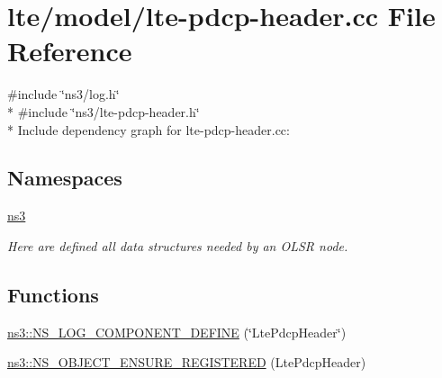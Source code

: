 \hypertarget{lte-pdcp-header_8cc}{}\section{lte/model/lte-\/pdcp-\/header.cc File Reference}
\label{lte-pdcp-header_8cc}
{\ttfamily \#include \char`\"{}ns3/log.\+h\char`\"{}}\\*
{\ttfamily \#include \char`\"{}ns3/lte-\/pdcp-\/header.\+h\char`\"{}}\\*
Include dependency graph for lte-\/pdcp-\/header.cc\+:
\subsection*{Namespaces}
\begin{DoxyCompactItemize}
\item 
 \hyperlink{namespacens3}{ns3}
\begin{DoxyCompactList}\small\item\em Here are defined all data structures needed by an O\+L\+SR node. \end{DoxyCompactList}\end{DoxyCompactItemize}
\subsection*{Functions}
\begin{DoxyCompactItemize}
\item 
\hyperlink{namespacens3_a8726a864989beb0043b2eed9d6ff1870}{ns3\+::\+N\+S\+\_\+\+L\+O\+G\+\_\+\+C\+O\+M\+P\+O\+N\+E\+N\+T\+\_\+\+D\+E\+F\+I\+NE} (\char`\"{}Lte\+Pdcp\+Header\char`\"{})
\item 
\hyperlink{namespacens3_a30e72edbf56ceb84ef776ddfc00c5c90}{ns3\+::\+N\+S\+\_\+\+O\+B\+J\+E\+C\+T\+\_\+\+E\+N\+S\+U\+R\+E\+\_\+\+R\+E\+G\+I\+S\+T\+E\+R\+ED} (Lte\+Pdcp\+Header)
\end{DoxyCompactItemize}
